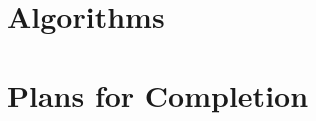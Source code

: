 \documentclass[10pt]{article}
\begin{document}
\lipsum[2] 







\section{Algorithms}

\lipsum[3] 








\section{Plans for Completion}

\lipsum[5] 








\end{document}
